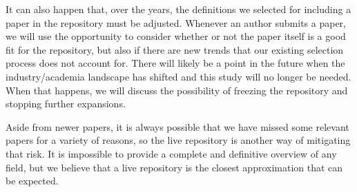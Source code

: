It can also happen that, over the years, the definitions we selected for including a paper in the repository must be adjusted.
Whenever an author submits a paper, we will use the opportunity to consider whether or not the paper itself is a good fit for the repository, but also if there are new trends that our existing selection process does not account for.
There will likely be a point in the future when the industry/academia landscape has shifted and this study will no longer be needed.
When that happens, we will discuss the possibility of freezing the repository and stopping further expansions.

Aside from newer papers, it is always possible that we have missed some relevant papers for a variety of reasons, so the live repository is another way of mitigating that risk.
It is impossible to provide a complete and definitive overview of any field, but we believe that a live repository is the closest approximation that can be expected.




